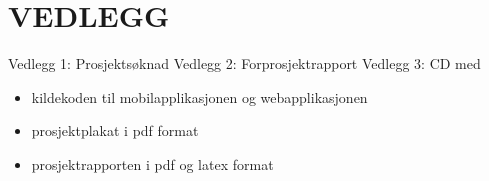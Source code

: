 \documentclass[../main.tex]{subfiles}
\begin{document}
\appendix

\chapter{VEDLEGG}

Vedlegg 1: Prosjektsøknad\newline
\newline
Vedlegg 2: Forprosjektrapport\newline
\newline
Vedlegg 3: CD med 
\begin{itemize}
\item kildekoden til mobilapplikasjonen og webapplikasjonen
\item prosjektplakat i pdf format
\item prosjektrapporten i pdf og latex format
\end{itemize}
\end{document}
